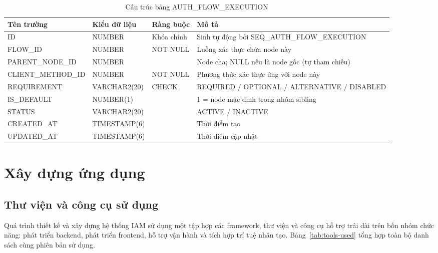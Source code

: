 \documentclass[../DoAn.tex]{subfiles}
\begin{document}
\begin{table}[H]
\centering
\caption{Cấu trúc bảng AUTH\_FLOW\_EXECUTION}
\label{tab:auth-flow-execution}
\footnotesize
\begin{tabular}{|p{3.0cm}|p{2.3cm}|p{2.7cm}|p{4.5cm}|}
\hline
\textbf{Tên trường} & \textbf{Kiểu dữ liệu} & \textbf{Ràng buộc} & \textbf{Mô tả} \\ \hline
ID & NUMBER & Khóa chính & Sinh tự động bởi SEQ\_AUTH\_FLOW\_EXECUTION \\ \hline
FLOW\_ID & NUMBER & NOT NULL & Luồng xác thực chứa node này \\ \hline
PARENT\_NODE\_ID & NUMBER &  & Node cha; NULL nếu là node gốc (tự tham chiếu) \\ \hline
CLIENT\_METHOD\_ID & NUMBER & NOT NULL & Phương thức xác thực ứng với node này \\ \hline
REQUIREMENT & VARCHAR2(20) & CHECK & REQUIRED / OPTIONAL / ALTERNATIVE / DISABLED \\ \hline
IS\_DEFAULT & NUMBER(1) & & 1 = node mặc định trong nhóm sibling \\ \hline
STATUS & VARCHAR2(20) & & ACTIVE / INACTIVE \\ \hline
CREATED\_AT & TIMESTAMP(6) & & Thời điểm tạo \\ \hline
UPDATED\_AT & TIMESTAMP(6) & & Thời điểm cập nhật \\ \hline
\end{tabular}
\end{table}

\section{Xây dựng ứng dụng}
\subsection{Thư viện và công cụ sử dụng}

Quá trình thiết kế và xây dựng hệ thống IAM sử dụng một tập hợp các framework, thư viện và công cụ hỗ trợ trải dài trên bốn nhóm chức năng: phát triển backend, phát triển frontend, hỗ trợ vận hành và tích hợp trí tuệ nhân tạo. Bảng~\ref{tab:tools-used} tổng hợp toàn bộ danh sách cùng phiên bản sử dụng.
\end{document}
